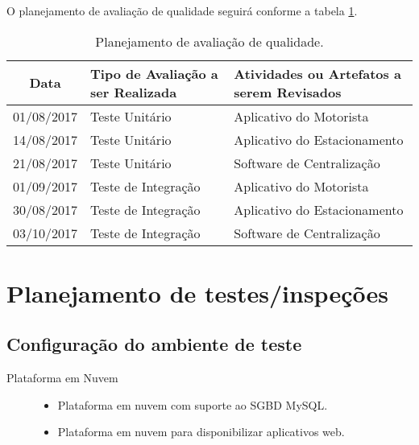 O planejamento de avaliação de qualidade seguirá conforme a tabela \ref{tab:quality-evaluation-plan}.

\begin{table}[h]
	\begin{tabularx}{.9\textwidth}{| c | X | X |}
		\hline
		\textbf{Data} & \textbf{Tipo de Avaliação a ser Realizada} & \textbf{Atividades ou Artefatos a serem Revisados} \\
		\hline
		01/08/2017    & Teste Unitário                              & Aplicativo do Motorista                            \\
		\hline
		14/08/2017    & Teste Unitário                              & Aplicativo do Estacionamento                       \\
		\hline
		21/08/2017    & Teste Unitário                              & Software de Centralização                        \\
		\hline
		01/09/2017    & Teste de Integração                        & Aplicativo do Motorista                            \\
		\hline
		30/08/2017    & Teste de Integração                        & Aplicativo do Estacionamento                       \\
		\hline
		03/10/2017    & Teste de Integração                        & Software de Centralização                        \\
		\hline
	\end{tabularx}
	\centering
	\caption{Planejamento de avaliação de qualidade.}
	\label{tab:quality-evaluation-plan}
\end{table}

\section{Planejamento de testes/inspeções}

\subsection{Configuração do ambiente de teste}

\begin{description}
	\item[Plataforma em Nuvem] \hfill
	\begin{itemize}
		\item Plataforma em nuvem com suporte ao SGBD MySQL.
		\item Plataforma em nuvem para disponibilizar aplicativos web.
	\end{itemize}
\end{description}


